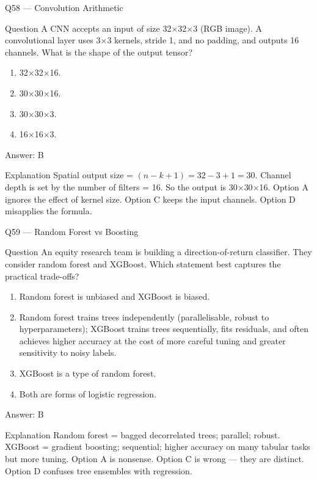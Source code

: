 \documentclass[aspectratio=169,8pt]{beamer}
\begin{document}
	\begin{frame}{Q58 --- Convolution Arithmetic}
		\begin{block}{Question}
			A CNN accepts an input of size 32$\times$32$\times$3 (RGB image). A convolutional layer uses 3$\times$3 kernels, stride 1, and no padding, and outputs 16 channels. What is the shape of the output tensor?
		\end{block}
		\begin{enumerate}
			\item 32$\times$32$\times$16.
			\item 30$\times$30$\times$16.
			\item 30$\times$30$\times$3.
			\item 16$\times$16$\times$3.
		\end{enumerate}
		\begin{exampleblock}{Answer: B}\end{exampleblock}
		\begin{block}{Explanation}
			Spatial output size = $(n - k + 1) = 32 - 3 + 1 = 30$. Channel depth is set by the number of filters = 16. So the output is 30$\times$30$\times$16. Option A ignores the effect of kernel size. Option C keeps the input channels. Option D misapplies the formula.
		\end{block}
	\end{frame}
	
	\begin{frame}{Q59 --- Random Forest vs Boosting}
		\begin{block}{Question}
			An equity research team is building a direction-of-return classifier. They consider random forest and XGBoost. Which statement best captures the practical trade-offs?
		\end{block}
		\begin{enumerate}
			\item Random forest is unbiased and XGBoost is biased.
			\item Random forest trains trees independently (parallelisable, robust to hyperparameters); XGBoost trains trees sequentially, fits residuals, and often achieves higher accuracy at the cost of more careful tuning and greater sensitivity to noisy labels.
			\item XGBoost is a type of random forest.
			\item Both are forms of logistic regression.
		\end{enumerate}
		\begin{exampleblock}{Answer: B}\end{exampleblock}
		\begin{block}{Explanation}
			Random forest = bagged decorrelated trees; parallel; robust. XGBoost = gradient boosting; sequential; higher accuracy on many tabular tasks but more tuning. Option A is nonsense. Option C is wrong --- they are distinct. Option D confuses tree ensembles with regression.
		\end{block}
	\end{frame}
	
\end{document}
